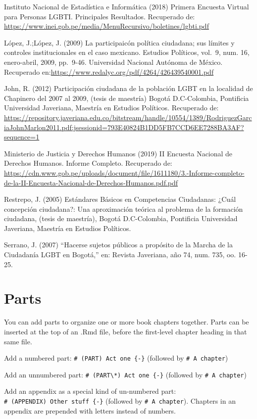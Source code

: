 \documentclass[
]{book}
\theoremstyle{definition}
\theoremstyle{definition}
\theoremstyle{definition}
\theoremstyle{definition}
\theoremstyle{remark}
\begin{document}
Instituto Nacional de Estadística e Informática (2018) Primera Encuesta Virtual para Personas LGBTI. Principales Resultados. Recuperado de: \url{https://www.inei.gob.pe/media/MenuRecursivo/boletines/lgbti.pdf}

López, J.;López, J. (2009) La participaicón política ciudadana; sus límites y controles institucionales en el caso mexicano. Estudios Políticos, vol.~9, num. 16, enero-abril, 2009, pp.~9-46. Universidad Nacional Autónoma de México. Recuperado en:\url{https://www.redalyc.org/pdf/4264/426439540001.pdf}

John, R. (2012) Participación ciudadana de la población LGBT en la localidad de Chapinero del 2007 al 2009, (tesis de maestría) Bogotá D.C-Colombia, Pontificia Universidad Javeriana, Maestría en Estudios Políticos. Recuperado de: \url{https://repository.javeriana.edu.co/bitstream/handle/10554/1389/RodriguezGarciaJohnMarlon2011.pdf;jsessionid=793E40824B1DD5FB7CCD6EE7288BA3AF?sequence=1}

Ministerio de Justicia y Derechos Humanos (2019) II Encuesta Nacional de Derechos Humanos. Informe Completo. Recuperado de: \url{https://cdn.www.gob.pe/uploads/document/file/1611180/3.-Informe-completo-de-la-II-Encuesta-Nacional-de-Derechos-Humanos.pdf.pdf}

Restrepo, J. (2005) Estándares Básicos en Competencias Ciudadanas: ¿Cuál concepción ciudadana?: Una aproximación teórica al problema de la formación ciudadana, (tesis de maestría), Bogotá D.C-Colombia, Pontificia Universidad Javeriana, Maestría en Estudios Políticos.

Serrano, J. (2007) ``Hacerse sujetos públicos a propósito de la Marcha de la Ciudadanía LGBT en Bogotá,'' en: Revista Javeriana, año 74, num. 735, oo. 16-25.

\hypertarget{parts}{%
\chapter{Parts}\label{parts}}

You can add parts to organize one or more book chapters together. Parts can be inserted at the top of an .Rmd file, before the first-level chapter heading in that same file.

Add a numbered part: \texttt{\#\ (PART)\ Act\ one\ \{-\}} (followed by \texttt{\#\ A\ chapter})

Add an unnumbered part: \texttt{\#\ (PART\textbackslash{}*)\ Act\ one\ \{-\}} (followed by \texttt{\#\ A\ chapter})

Add an appendix as a special kind of un-numbered part: \texttt{\#\ (APPENDIX)\ Other\ stuff\ \{-\}} (followed by \texttt{\#\ A\ chapter}). Chapters in an appendix are prepended with letters instead of numbers.
\end{document}
